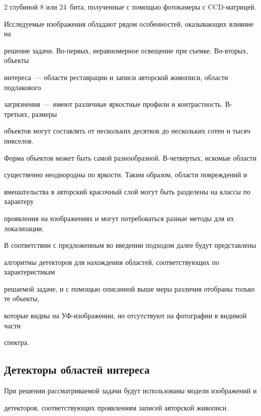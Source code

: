 \begin{multicols}{2}
глубиной 8 или 24~бита, полученные с помощью фотокамеры с CCD-матрицей. 


Исследуемые изображения обладают рядом особенностей, оказывающих влияние на 


решение задачи. Во-пер\-вых, неравномерное освещение при съемке. Во-вто\-рых, объекты 


интереса~--- области реставрации и записи авторской живописи, области подлакового 


загрязнения~--- имеют различные яркостные профили и контрастность. В-третьих, размеры 


объектов могут составлять от нескольких десятков до нескольких сотен и тысяч пикселов. 


Форма объектов может быть самой разнообразной. В-чет\-вер\-тых, искомые области 


существенно неоднородны по яркости. Таким образом, области повреждений и 


вмешательства в авторский красочный слой могут быть разделены на классы по характеру 


проявления на изображениях и могут потребоваться разные методы для их локализации.


  


  В соответствии с предложенным во введении подходом далее будут представлены 


алгоритмы детекторов для нахождения областей, со\-от\-вет\-ст\-ву\-ющих по характеристикам 


решаемой задаче, и с помощью описанной выше меры различия отобраны только те объекты, 


которые видны на УФ-изоб\-ра\-же\-нии, но отсутствуют на фотографии в видимой части 


спектра.





\subsection{Детекторы областей интереса} %


  


  При решении рассматриваемой задачи будут использованы модели изображений и 


детекторов, соответствующих проявлениям записей авторской живописи. 


  



\end{multicols}
